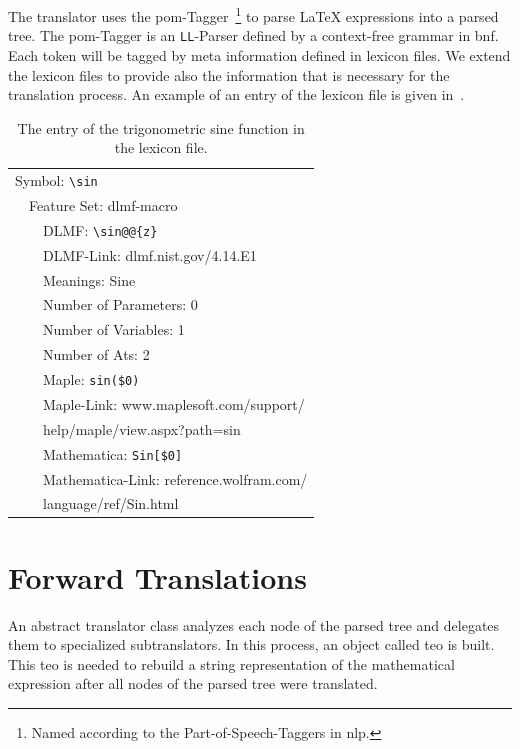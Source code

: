 \documentclass[a4paper,11pt]{article}
\theoremstyle{defTheoStyle}
\theoremstyle{defExampStyle}
\begin{document}
The translator uses the \gls*{pom}-Tagger~\parencite{POM-Tagger}\footnote{Named according to the Part-of-Speech-Taggers in \gls*{nlp}.} to parse \LaTeX{} expressions into a parsed tree. The \gls*{pom}-Tagger is an \texttt{LL}-Parser defined by a context-free grammar in \gls*{bnf}. Each token will be tagged by meta information defined in lexicon files. We extend the lexicon files to provide also the information that is necessary for the translation process. An example of an entry of the lexicon file is given in~.

\begin{table}[ht!]
	\centering
	\begin{tabular}{lll}
	\hline
	\multicolumn{3}{l}{Symbol: \texttt{\textbackslash sin}} \\
	\! & \multicolumn{2}{l}{Feature Set: dlmf-macro} \\
	\! & \! & DLMF: \verb|\sin@@{z}|\\
	\! & \! & DLMF-Link: dlmf.nist.gov/4.14.E1\\
	\! & \! & Meanings: Sine\\
	\! & \! & Number of Parameters: 0\\
	\! & \! & Number of Variables: 1\\
	\! & \! & Number of Ats: 2\\
	\! & \! & Maple: \verb|sin($0)|\\
	\! & \! & Maple-Link: www.maplesoft.com/support/\\
	\! & \! & \hspace{32pt} help/maple/view.aspx?path=sin\\
	\! & \! & Mathematica: \verb|Sin[$0]|\\
	\! & \! & Mathematica-Link: reference.wolfram.com/\\
	\! & \! & \hspace{32pt} language/ref/Sin.html\\
	\hline
	\end{tabular}
	\caption{The entry of the trigonometric sine function in the lexicon file.}
	\label{tab:sine-lex-example}
\end{table} \section{Forward Translations}\label{sec:forward-translation}
An abstract translator class analyzes each node of the parsed tree and delegates them to specialized subtranslators. In this process, an object called \gls*{teo} is built. This \gls*{teo} is needed to rebuild a string representation of the mathematical expression after all nodes of the parsed tree were translated.
\end{document}
